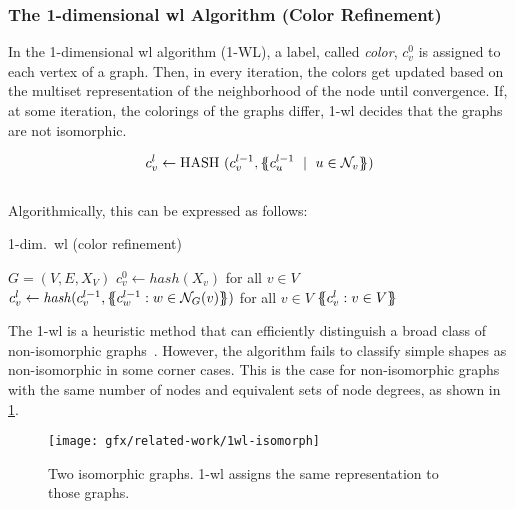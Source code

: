 \subsubsection{The 1-dimensional \acs*{wl} Algorithm (Color Refinement)}
In the 1-dimensional \ac{wl} algorithm (1-WL), a label, called \emph{color}, $c_{v}^{0}$ is assigned to each vertex of a graph.
Then, in every iteration, the colors get updated based on the multiset representation of the neighborhood of the node until convergence. If, at some iteration, the colorings of the graphs differ, 1-\ac{wl} decides that the graphs are not isomorphic.

\begin{align*}
    c_{v}^{l} \leftarrow \mathrm{HASH}\ (c_{v}^{l-1}, \ldblbrace c_{u}^{l-1}\ \mid \ u \in \mathcal{N}_{v} \rdblbrace)
\end{align*}
\\

Algorithmically, this can be expressed as follows:
\begin{algorithm}[H]
    \caption{1-dim.\ \ac{wl} (color refinement)}
    \label{alg:related:wl}
    \begin{algorithmic}[1]
        \Require $G = (V,E,X_{V})$
        \State $c_{v}^{0} \gets \mathit{hash}(X_{v})$ for all $v \in V$
        \Repeat
        \State $c_{v}^{l} \gets \mathit{hash}(c_{v}^{l-1}, \ldblbrace c_{w}^{l-1}: w \in \mathcal N_{G}(v)\rdblbrace)$ for all $v \in V$
        \State \Return $\ldblbrace c_{v}^l : v \in V \rdblbrace$
    \end{algorithmic}
\end{algorithm}

The 1-\acs{wl} is a heuristic method that can efficiently distinguish a broad class of non-isomorphic graphs~\cite{Babai1979}.
However, the algorithm fails to classify simple shapes as non-isomorphic in some corner cases.
This is the case for non-isomorphic graphs with the same number of nodes and equivalent sets of node degrees, as shown in \cref*{fig:related:1-wl-indistinguishable}.

\begin{figure}[H]
    \centering
    \texttt{[image: gfx/related-work/1wl-isomorph]}
    \caption{Two isomorphic graphs. 1-\ac{wl} assigns the same representation to those graphs.}\label{fig:related:1-wl-indistinguishable}
\end{figure}

